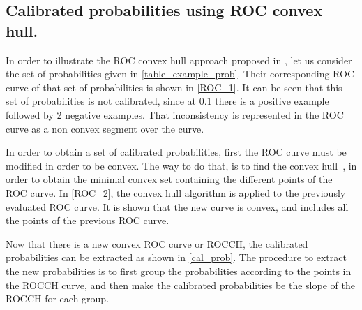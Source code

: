   \subsection{Calibrated probabilities using ROC convex hull.}
  In order to illustrate the ROC convex hull approach proposed in \citep{Hernandez-Orallo2012},
  let us consider the set of probabilities given in \figurename{ \ref{table_example_prob}}.
  Their corresponding  ROC curve of that set of probabilities is shown in \figurename{ 
\ref{ROC_1}}.  It can be seen that this set of probabilities is not calibrated, since at 0.1 there 
is a positive example  followed by 2 negative examples. That inconsistency is represented in the ROC 
curve as a non convex segment  over the curve.
  
  In order to obtain a set of calibrated probabilities, first the ROC curve must be modified in 
order to be convex.
  The way to do that, is to find the convex \mbox{hull \citep{Hernandez-Orallo2012}}, 
  in order to obtain the minimal convex set containing the different points of the ROC curve.
  In \figurename{ \ref{ROC_2}}, the convex hull algorithm is applied to the previously evaluated 
ROC curve.
  It is shown that the new curve is convex, and includes all the points of the previous ROC curve.
  
  Now that there is a new convex ROC curve or ROCCH, the calibrated probabilities can be extracted 
as shown
  in  \figurename{ \ref{cal_prob}}. The procedure to extract the new probabilities is to first group 
the
  probabilities according to the points in the ROCCH curve, and then make the calibrated
  probabilities be the slope of the ROCCH for each group.
  

